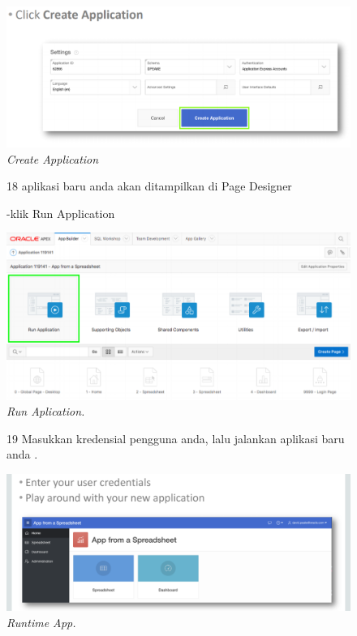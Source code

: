 \begin{enumerate}
\begin{figure}
    \begin{center}
\includegraphics[scale=0.4]{figures/10.PNG}
    \caption{\textit{Create Application}}
        \end{center}
\label{gambar}
\end{figure}

\begin{figure}
\item[18]aplikasi baru anda akan ditampilkan di Page Designer

        -klik Run Application

    \begin{center}
\includegraphics[scale=0.4]{figures/gambar2-8.PNG}
    \caption{\textit{Run Aplication.}}
        \end{center}
\label{gambar}
\end{figure}


\begin{figure}
\item[19]Masukkan kredensial pengguna anda, lalu jalankan aplikasi baru anda .

    \begin{center}
\includegraphics[scale=0.4]{figures/gambar2-9.PNG}
    \caption{\textit{Runtime App.}}
        \end{center}
\label{gambar}
\end{figure}



\end{enumerate}
